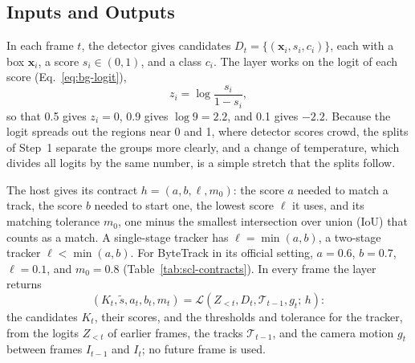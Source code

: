 \subsection{Inputs and Outputs}\label{sec:scl-problem}
In each frame $t$, the detector gives candidates $D_t=\{(\mathbf{x}_i,s_i,c_i)\}$, each with a box $\mathbf{x}_i$, a score $s_i\in(0,1)$, and a class $c_i$. The layer works on the logit of each score (Eq.~\eqref{eq:bg-logit}),
\begin{equation}
z_i=\log\frac{s_i}{1-s_i},
\label{eq:scl-logit}
\end{equation}
so that 0.5 gives $z_i=0$, 0.9 gives $\log 9=2.2$, and 0.1 gives $-2.2$. Because the logit spreads out the regions near 0 and 1, where detector scores crowd, the splits of Step~1 separate the groups more clearly, and a change of temperature, which divides all logits by the same number, is a simple stretch that the splits follow.

The host gives its contract $h=(a,b,\ell,m_0)$: the score $a$ needed to match a track, the score $b$ needed to start one, the lowest score $\ell$ it uses, and its matching tolerance $m_0$, one minus the smallest intersection over union (IoU) that counts as a match. A single-stage tracker has $\ell=\min(a,b)$, a two-stage tracker $\ell<\min(a,b)$. For ByteTrack in its official setting, $a=0.6$, $b=0.7$, $\ell=0.1$, and $m_0=0.8$ (Table~\ref{tab:scl-contracts}). In every frame the layer returns
\begin{equation}
\left(K_t,\tilde{s},a_t,b_t,m_t\right)=
\mathcal{L}\left(Z_{<t},D_t,\mathcal{T}_{t-1},g_t;\,h\right):
\label{eq:scl-layer}
\end{equation}
the candidates $K_t$, their scores, and the thresholds and tolerance for the tracker, from the logits $Z_{<t}$ of earlier frames, the tracks $\mathcal{T}_{t-1}$, and the camera motion $g_t$ between frames $I_{t-1}$ and $I_t$; no future frame is used.

